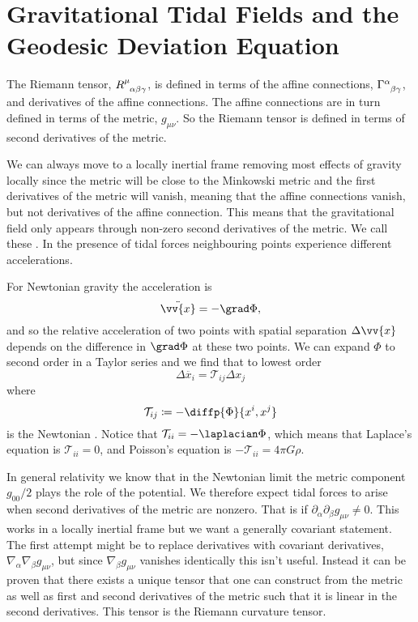 \documentclass[fleqn]{NotesClass}
\newcommand*{\christoffel}[3]{\tensor{\Gamma}{^{#1}_{{#2}{#3}}}}
\newcommand*{\covariantDerivative}[1]{\nabla_{\!#1}}
\begin{document}
    \section{Gravitational Tidal Fields and the Geodesic Deviation Equation}
    The Riemann tensor, \(\tensor{R}{^\mu_{\alpha\beta\gamma}}\), is defined in terms of the affine connections, \(\christoffel{\alpha}{\beta}{\gamma}\), and derivatives of the affine connections.
    The affine connections are in turn defined in terms of the metric, \(g_{\mu\nu}\).
    So the Riemann tensor is defined in terms of second derivatives of the metric.
    
    We can always move to a locally inertial frame removing most effects of gravity locally since the metric will be close to the Minkowski metric and the first derivatives of the metric will vanish, meaning that the affine connections vanish, but not derivatives of the affine connection.
    This means that the gravitational field only appears through non-zero second derivatives of the metric.
    We call these .
    In the presence of tidal forces neighbouring points experience different accelerations.
    
    For Newtonian gravity the acceleration is
    \begin{equation}
        \ddot{\vv{x}} = - \grad \Phi,
    \end{equation}
    and so the relative acceleration of two points with spatial separation \(\Delta\vv{x}\) depends on the difference in \(\grad\Phi\) at these two points.
    We can expand \(\Phi\) to second order in a Taylor series and we find that to lowest order
    \begin{equation}
        \Delta \ddot{x_i} = \mathcal{T}_{ij} \Delta x_j
    \end{equation}
    where
    \begin{equation}
        \mathcal{T}_{ij} \coloneqq -\diffp{\Phi}{x^i, x^j}
    \end{equation}
    is the Newtonian .
    Notice that \(\mathcal{T}_{ii} = -\laplacian\Phi\), which means that Laplace's equation is \(\mathcal{T}_{ii} = 0\), and Poisson's equation is \(-\mathcal{T}_{ii} = 4\pi G\rho\).
    
    In general relativity we know that in the Newtonian limit the metric component \(g_{00}/2\) plays the role of the potential.
    We therefore expect tidal forces to arise when second derivatives of the metric are nonzero.
    That is if \(\partial_\alpha \partial_\beta g_{\mu\nu} \ne 0\).
    This works in a locally inertial frame but we want a generally covariant statement.
    The first attempt might be to replace derivatives with covariant derivatives, \(\covariantDerivative{\alpha}\covariantDerivative{\beta} g_{\mu\nu}\), but since \(\covariantDerivative{\beta}g_{\mu\nu}\) vanishes identically this isn't useful.
    Instead it can be proven that there exists a unique tensor that one can construct from the metric as well as first and second derivatives of the metric such that it is linear in the second derivatives.
    This tensor is the Riemann curvature tensor.
    
\end{document}
